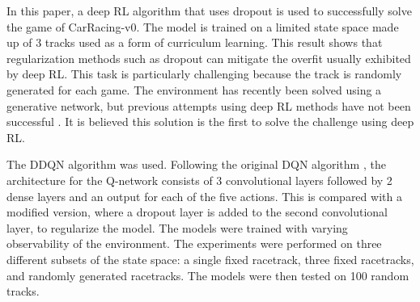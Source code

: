 \documentclass{article}
\begin{document}
In this paper, a deep RL algorithm that uses dropout
\cite{Dropout} is used to successfully solve the game of
CarRacing-v0\cite{CarRacing}. The model is trained on a
limited state space made up of 3 tracks used as a form of curriculum
learning\cite{bengio2009curriculum}. This result shows that
regularization methods such as dropout can mitigate the overfit
usually exhibited by deep RL. This task is particularly challenging
because the track is randomly generated for each game. The environment
has recently been solved using a generative network, but previous
attempts using deep RL methods have not been successful
\cite{World_Models} \cite{CarRacing1}. It is believed this solution is
the first to solve the challenge using deep RL.  

The DDQN algorithm \cite{DDQN} was used.
Following the original DQN algorithm \cite{DQN}, the architecture
for the Q-network consists of 3 convolutional layers followed by 2
dense layers and an output for each of the five actions.
This is compared with a modified version, where a dropout layer is
added to the second convolutional layer, to regularize the model.  
The models were trained with varying observability of the
environment. The experiments were performed on three different subsets of
the state space: a single fixed racetrack, three fixed racetracks, and 
randomly generated racetracks. The models were then tested on 100
random tracks.
\end{document}
